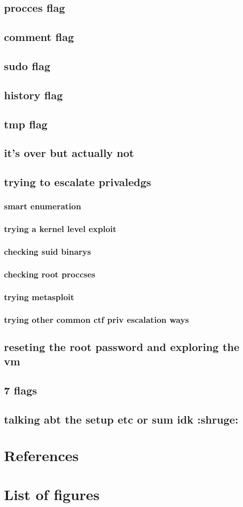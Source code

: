 \documentclass[a4paper]{article}
\begin{document}
\subsection{procces flag}
\subsection{comment flag}
\subsection{sudo flag}
\subsection{history flag}
\subsection{tmp flag}
\subsection{it's over but actually not}
\subsection{trying to escalate privaledgs}
\subsubsection{smart enumeration}
\subsubsection{trying a kernel level exploit}
\subsubsection{checking suid binarys}
\subsubsection{checking root proccses}
\subsubsection{trying metasploit}
\subsubsection{trying other common ctf priv escalation ways}
\subsection{reseting the root password and exploring the vm}
\subsection{7 flags}
\subsection{talking abt the setup etc or sum idk :shruge:}

\newpage
\section{References}

\newpage
\section{List of figures}

\listoffigures
\end{document}
